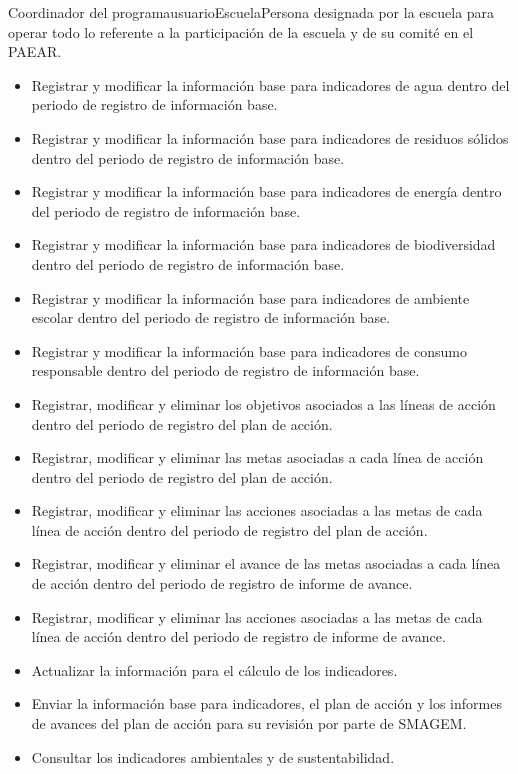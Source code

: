 \begin{actor}{Coordinador del programa}{usuarioEscuela}{Persona designada por la escuela para operar todo lo referente a la participación de la escuela y de su comité en el PAEAR.}
\begin{itemize}
			\item Registrar y modificar la información base para indicadores de agua dentro del periodo de registro de información base.
			\item Registrar y modificar la información base para indicadores de residuos sólidos dentro del periodo de registro de información base.
			\item Registrar y modificar la información base para indicadores de energía dentro del periodo de registro de información base.
			\item Registrar y modificar la información base para indicadores de biodiversidad dentro del periodo de registro de información base.
			\item Registrar y modificar la información base para indicadores de ambiente escolar dentro del periodo de registro de información base.
			\item Registrar y modificar la información base para indicadores de consumo responsable	dentro del periodo de registro de información base.

			
			\item Registrar, modificar y eliminar los objetivos asociados a las líneas de acción dentro del periodo de registro del plan de acción.
			\item Registrar, modificar y eliminar las metas asociadas a cada línea de acción dentro del periodo de registro del plan de acción.
			\item Registrar, modificar y eliminar las acciones asociadas a las metas de cada línea de acción dentro del periodo de registro del plan de acción.

			\item Registrar, modificar y eliminar el avance de las metas asociadas a cada línea de acción dentro del periodo de registro de informe de avance.
			\item Registrar, modificar y eliminar las acciones asociadas a las metas de cada línea de acción  dentro del periodo de registro de informe de avance.
			\item Actualizar la información para el cálculo de los indicadores.

			\item Enviar la información base para indicadores, el plan de acción y los informes de avances del plan de acción para su revisión por parte de SMAGEM.
			\item Consultar los indicadores ambientales y de sustentabilidad.
		\end{itemize}



\end{actor}
